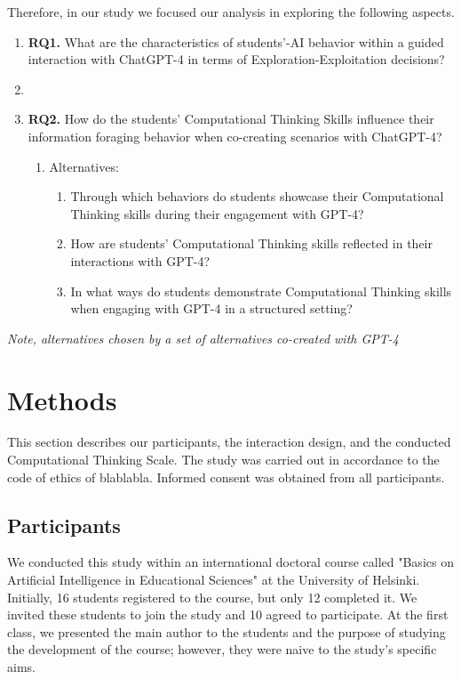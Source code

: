 \documentclass[sn-mathphys, Numbered]{sn-jnl}%
\theoremstyle{thmstyleone}%
\theoremstyle{thmstyletwo}%
\theoremstyle{thmstylethree}%
\begin{document}
Therefore, in our study we focused our analysis in exploring the following aspects.
\begin{enumerate}
    \item[] \textbf{RQ1.} What are the characteristics of students'-AI behavior within a guided interaction with ChatGPT-4 in terms of Exploration-Exploitation decisions?
    \item []
    \item  [] \textbf{RQ2.} How do the students' Computational Thinking Skills influence their information foraging behavior when co-creating scenarios with ChatGPT-4?
              \begin{enumerate}
              \item[] Alternatives:
        \begin{enumerate}
            \item  Through which behaviors do students showcase their Computational Thinking skills during their engagement with GPT-4?
            \item How are students' Computational Thinking skills reflected in their interactions with GPT-4? 
            \item In what ways do students demonstrate Computational Thinking skills when engaging with GPT-4 in a structured setting?

    \end{enumerate}
 \end{enumerate}
 
\end{enumerate}

\textit{Note, alternatives chosen by a set of alternatives co-created with GPT-4 }


\section{Methods}\label{Methods}

This section describes our participants, the interaction design, and the conducted Computational Thinking Scale. The study was carried out in accordance to the code of ethics of blablabla. Informed consent was obtained from all participants.

\subsection*{Participants}

We conducted this study within an international doctoral course called "Basics on Artificial Intelligence in Educational Sciences" at the University of Helsinki. Initially, 16 students registered to the course, but only 12 completed it. We invited these students to join the study and 10 agreed to participate. At the first class, we presented the main author to the students and the purpose of studying the development of the course; however, they were naive to the study's specific aims.
\end{document}
